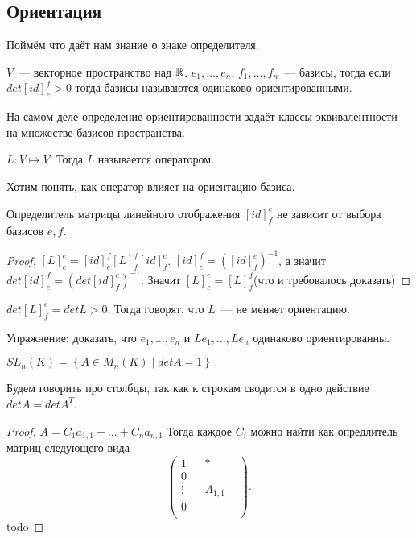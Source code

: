 \subsection{Ориентация}
\begin{motivation}
    Поймём что даёт нам знание о знаке определителя.
\end{motivation}
\begin{definition}
    $V$~--- векторное пространство над  $\mathbb{R}$. $e_1,\dots, e_n$, $f_1,\dots, f_n$~--- базисы,
    тогда если $det[id]^f_e>0$ тогда базисы называются одинаково ориентированными.
\end{definition}
\begin{remark}
    На самом деле определение ориентированности задаёт классы эквивалентности на множестве
    базисов пространства.
\end{remark}
\begin{definition}
    $L\colon V\mapsto V$. Тогда $L$ называется оператором.
\end{definition}
\begin{motivation}
    Хотим понять, как оператор влияет на ориентацию базиса.
\end{motivation}
\begin{remark}
    Определитель матрицы линейного отображения $[id]^e_f$ не зависит от выбора базисов $e, f$.
\end{remark}
\begin{proof}
    $[L]^e_e = [id]^f_e [L]^f_f [id]^e_f$. $[id]^f_e = ([id]^e_f)^{-1}$, а значит 
    $det [id]^f_e = (det [id]^e_f)^{-1}$. Значит $[L]^e_e = [L]^f_f$(что и требовалось доказать)
\end{proof}
\begin{definition}
    $det [L]^e_f = det L > 0$. Тогда говорят, что $L$~--- не меняет ориентацию.
\end{definition}
\begin{remark}
    Упражнение: доказать, что $e_1,\dots, e_n$ и $Le_1,\dots, Le_n$ одинаково ориентированны.
\end{remark}
\begin{definition}
    $SL_n(K) = \left\{A\in M_n(K)\mid det A = 1 \right\}$
\end{definition}
\begin{theorem}
    Будем говорить про столбцы, так как к строкам сводится в одно действие $det A = det A^T$.
\end{theorem}
\begin{proof}
    $A = C_1a_{1,1} + \dots + C_na_{n,1}$
    Тогда каждое $C_i$ можно найти как опредлитель матриц следующего вида
     \[
    \left(\begin{array}{c|ccc}
            1 & & * &\\
            \hline
            0 & &  &\\
            \vdots & & A_{\overline{1},\overline{1}} &\\
            0 & &  &\\
    \end{array}\right)
    .\] 
    todo
\end{proof}
